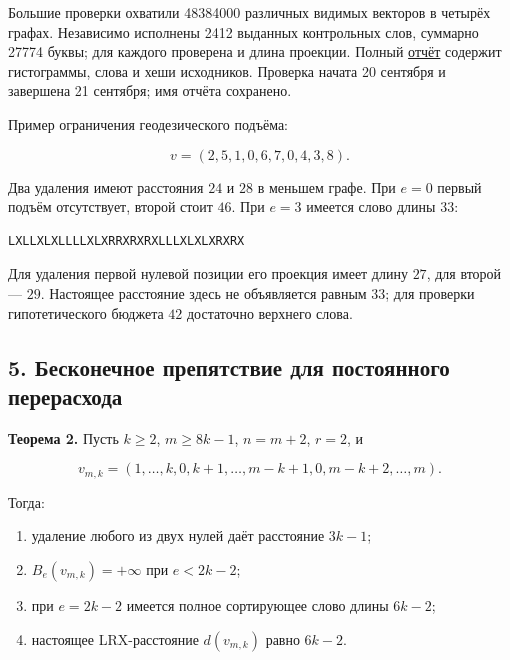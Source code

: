 \documentclass[
  11pt,
  a4paper,
]{article}
\providecommand{\tightlist}{%
  \setlength{\itemsep}{0pt}\setlength{\parskip}{0pt}}
\begin{document}
Большие проверки охватили 48384000 различных видимых векторов в четырёх
графах. Независимо исполнены 2412 выданных контрольных слов, суммарно
27774 буквы; для каждого проверена и длина проекции. Полный
\href{literature/multiset_marked_zero_lift_final_20260920.json}{отчёт}
содержит гистограммы, слова и хеши исходников. Проверка начата 20
сентября и завершена 21 сентября; имя отчёта сохранено.

Пример ограничения геодезического подъёма:

\[v=(2,5,1,0,6,7,0,4,3,8).\]

Два удаления имеют расстояния \(24\) и \(28\) в меньшем графе. При
\(e=0\) первый подъём отсутствует, второй стоит \(46\). При \(e=3\)
имеется слово длины \(33\):

\begin{verbatim}
LXLLXLXLLLLXLXRRXRXRXLLLXLXLXRXRX
\end{verbatim}

Для удаления первой нулевой позиции его проекция имеет длину \(27\), для
второй --- \(29\). Настоящее расстояние здесь не объявляется равным
\(33\); для проверки гипотетического бюджета \(42\) достаточно верхнего
слова.

\hypertarget{ux431ux435ux441ux43aux43eux43dux435ux447ux43dux43eux435-ux43fux440ux435ux43fux44fux442ux441ux442ux432ux438ux435-ux434ux43bux44f-ux43fux43eux441ux442ux43eux44fux43dux43dux43eux433ux43e-ux43fux435ux440ux435ux440ux430ux441ux445ux43eux434ux430}{%
\subsection{5. Бесконечное препятствие для постоянного
перерасхода}\label{ux431ux435ux441ux43aux43eux43dux435ux447ux43dux43eux435-ux43fux440ux435ux43fux44fux442ux441ux442ux432ux438ux435-ux434ux43bux44f-ux43fux43eux441ux442ux43eux44fux43dux43dux43eux433ux43e-ux43fux435ux440ux435ux440ux430ux441ux445ux43eux434ux430}}

\textbf{Теорема 2.} Пусть \(k\ge2\), \(m\ge8k-1\), \(n=m+2\), \(r=2\), и

\[v_{m,k}=(1,\ldots,k,0,k+1,\ldots,m-k+1,0,m-k+2,\ldots,m). \tag{8}\]

Тогда:

\begin{enumerate}
\def\labelenumi{\arabic{enumi}.}
\tightlist
\item
  удаление любого из двух нулей даёт расстояние \(3k-1\);
\item
  \(B_e(v_{m,k})=+\infty\) при \(e<2k-2\);
\item
  при \(e=2k-2\) имеется полное сортирующее слово длины \(6k-2\);
\item
  настоящее LRX-расстояние \(d(v_{m,k})\) равно \(6k-2\).
\end{enumerate}
\end{document}
